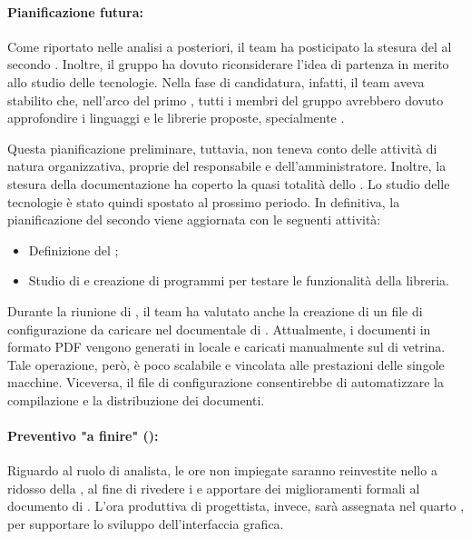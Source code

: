 \paragraph*{Pianificazione futura:}
\par Come riportato nelle analisi a posteriori, il team ha posticipato la stesura del  al secondo . Inoltre, il gruppo ha dovuto riconsiderare l’idea di partenza in merito allo studio delle tecnologie. Nella fase di candidatura, infatti, il team aveva stabilito che, nell’arco del primo , tutti i membri del gruppo avrebbero dovuto approfondire i linguaggi e le librerie proposte, specialmente .

\vspace{0.5\baselineskip}
\par Questa pianificazione preliminare, tuttavia, non teneva conto delle attività di natura organizzativa, proprie del responsabile e dell’amministratore. Inoltre, la stesura della documentazione ha coperto la quasi totalità dello . Lo studio delle tecnologie è stato quindi spostato al prossimo periodo. In definitiva, la pianificazione del secondo  viene aggiornata con le seguenti attività:
\begin{itemize}
  \item Definizione del ;
  \item Studio di  e creazione di programmi per testare le funzionalità della libreria.
\end{itemize}

\vspace{0.5\baselineskip}
\par Durante la riunione di , il team ha valutato anche la creazione di un file di configurazione da caricare nel  documentale di . Attualmente, i documenti in formato PDF vengono generati in locale e caricati manualmente sul  di vetrina. Tale operazione, però, è poco scalabile e vincolata alle prestazioni delle singole macchine. Viceversa, il file di configurazione consentirebbe di automatizzare la compilazione e la distribuzione dei documenti.

\paragraph*{Preventivo "a finire" ():}
\par Riguardo al ruolo di analista, le ore non impiegate saranno reinvestite nello  a ridosso della , al fine di rivedere i  e apportare dei miglioramenti formali al documento di \AdR. L'ora produttiva di progettista, invece, sarà assegnata nel quarto , per supportare lo sviluppo dell'interfaccia grafica.

